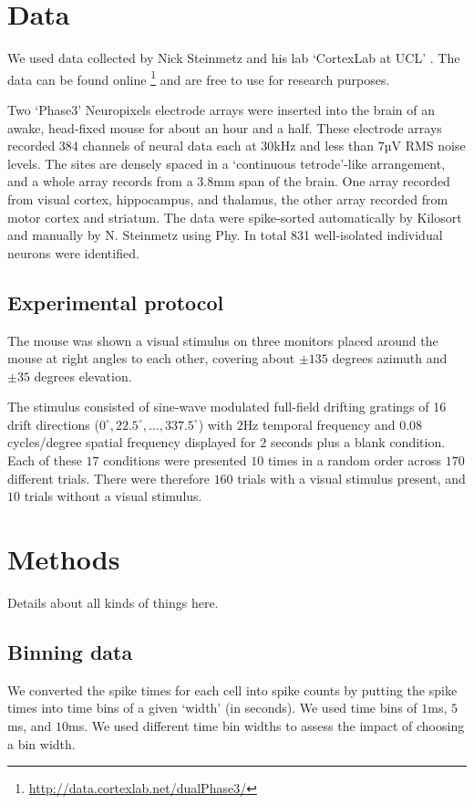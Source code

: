 \documentclass[a4paper,12pt]{article}
\theoremstyle{definition}
\begin{document}
\section{Data}
We used data collected by Nick Steinmetz and his lab `CortexLab at UCL' \cite{steinmetz}. The data can be found online \footnote{\url{http://data.cortexlab.net/dualPhase3/}} and are free to use for research purposes.

Two `Phase3' Neuropixels \cite{jun} electrode arrays were inserted into the brain of an awake, head-fixed mouse for about an hour and a half. These electrode arrays recorded $384$ channels of neural data each at $30$kHz and  less than $7$µV RMS noise levels. The sites are densely spaced in a `continuous tetrode'-like arrangement, and a whole array records from a $3.8$mm span of the brain. One array recorded from visual cortex, hippocampus,  and thalamus, the other array recorded from motor cortex and striatum. The data were spike-sorted automatically by Kilosort and manually by N. Steinmetz using Phy. In total 831 well-isolated individual neurons were identified.

  \subsection{Experimental protocol}
  The mouse was shown a visual stimulus on three monitors placed around the mouse at right angles to each other, covering about $\pm 135$ degrees azimuth and $\pm 35$ degrees elevation.

  The stimulus consisted of sine-wave modulated full-field drifting gratings of 16 drift directions ($0^{\circ}, 22.5^{\circ}, \dots, 337.5^{\circ}$) with $2$Hz temporal frequency and $0.08$ cycles/degree spatial frequency displayed for $2$ seconds plus a blank condition. Each of these $17$ conditions were presented $10$ times in a random order across $170$ different trials. There were therefore $160$ trials with a visual stimulus present, and $10$ trials without a visual stimulus.

\section{Methods}
Details about all kinds of things here.
    \subsection{Binning data}
    We converted the spike times for each cell into spike counts by putting the spike times into time bins of a given `width' (in seconds). We used time bins of $1$ms, $5$ms, and $10$ms. We used different time bin widths to assess the impact of choosing a bin width.
\end{document}
